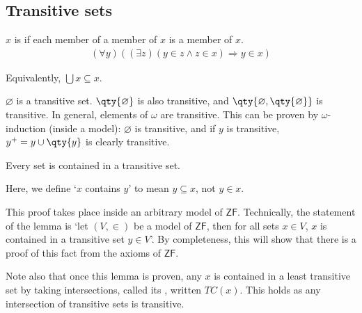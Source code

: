 \subsection{Transitive sets}
\begin{definition}
    $x$ is  if each member of a member of $x$ is a member of $x$.
    \begin{align*}
        (\forall y)((\exists z)(y \in z \wedge z \in x) \Rightarrow y \in x)
    \end{align*}
\end{definition}
Equivalently, $\bigcup x \subseteq x$.
\begin{example}
    $\varnothing$ is a transitive set.
    $\qty{\varnothing}$ is also transitive, and $\qty{\varnothing, \qty{\varnothing}}$ is transitive.
    In general, elements of $\omega$ are transitive.
    This can be proven by $\omega$-induction (inside a model): $\varnothing$ is transitive, and if $y$ is transitive, $y^+ = y \cup \qty{y}$ is clearly transitive.
\end{example}
\begin{lemma}
    Every set is contained in a transitive set.
\end{lemma}
Here, we define `$x$ contains $y$' to mean $y \subseteq x$, not $y \in x$.
\begin{remark}
    This proof takes place inside an arbitrary model of $\mathsf{ZF}$.
    Technically, the statement of the lemma is `let $(V, \in)$ be a model of $\mathsf{ZF}$, then for all sets $x \in V$, $x$ is contained in a transitive set $y \in V$'.
    By completeness, this will show that there is a proof of this fact from the axioms of $\mathsf{ZF}$.

    Note also that once this lemma is proven, any $x$ is contained in a least transitive set by taking intersections, called its , written $TC(x)$.
    This holds as any intersection of transitive sets is transitive.
\end{remark}
